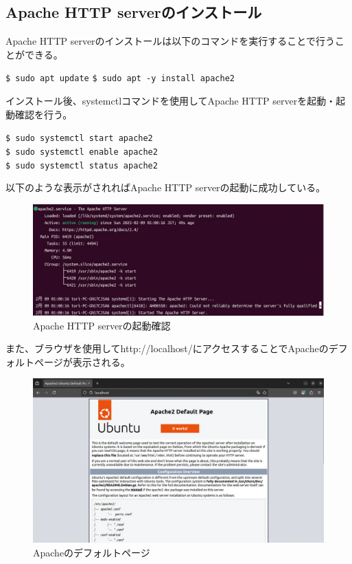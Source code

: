 \documentclass[a4paper, 11pt, dvipdfmx]{jsarticle}
\begin{document}
\subsection{Apache HTTP serverのインストール}
Apache HTTP serverのインストールは以下のコマンドを実行することで行うことができる。
\begin{terminalbox}
  \verb|$ sudo apt update|
  \verb|$ sudo apt -y install apache2|
\end{terminalbox}
インストール後、systemctlコマンドを使用してApache HTTP serverを起動・起動確認を行う。
\begin{terminalbox}
  \verb|$ sudo systemctl start apache2|\\
  \verb|$ sudo systemctl enable apache2|\\
  \verb|$ sudo systemctl status apache2|
\end{terminalbox}
以下のような表示がされればApache HTTP serverの起動に成功している。
\begin{figure}[H]
  \centering
  \includegraphics[width=14cm]{images/linux-server/12_3_status-apache.png}
  \caption{Apache HTTP serverの起動確認}
\end{figure}
また、ブラウザを使用してhttp://localhost/にアクセスすることでApacheのデフォルトページが表示される。
\begin{figure}[H]
  \centering
  \includegraphics[width=14cm]{images/linux-server/12_3-2_welcompage.png}
  \caption{Apacheのデフォルトページ}
\end{figure}
\end{document}
